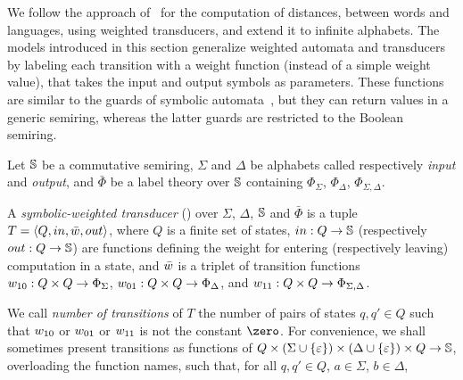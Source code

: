 We follow the approach of~\cite{Mohri03EDWA} for the computation of distances,
between words and languages, using weighted transducers,
and extend it to infinite alphabets.
%
The models introduced in this section generalize
weighted automata and transducers~\cite{Droste09handbook}
by labeling each transition with a weight function (instead of a simple weight value),
that takes the input and output symbols as parameters.
These functions are similar to the guards of symbolic automata~\cite{dAntoniVeanes17CAV,dAntoni21CACM},
but they can return values in a generic semiring,
whereas the latter guards are restricted to the Boolean semiring.
%

\noindent
Let $\mathbb{S}$ be a commutative semiring,
$\Sigma$ and $\Delta$ be alphabets called respectively \emph{input} and \emph{output}, %
and $\bar\Phi$ be a label theory over $\mathbb{S}$
containing $\Phi_\Sigma$, $\Phi_\Delta$, $\Phi_{\Sigma, \Delta}$.

\begin{definition}
\label{def:transducer} \label{def:SWT}
A \emph{symbolic-weighted transducer} (\SWT)
over $\Sigma$, $\Delta$, $\mathbb{S}$ and $\bar\Phi$
is a tuple
$T = \< Q, \init, \bar{\wei}, \final >$,
where $Q$ is a finite set of states,
$\mathsf{in} : Q \to \Semiring$   %
(respectively $\mathsf{out} : Q \to \Semiring$)  %
are functions defining the weight for entering
(respectively leaving) computation in a state,
and $\bar{\wei}$ is a triplet of transition functions
$\wei_{10}: Q \times Q \to \Phi_{\Sigma}$,
$\wei_{01}: Q \times Q \to \Phi_{\Delta}$, and
$\wei_{11}: Q \times Q \to \Phi_{\Sigma, \Delta}$.
\end{definition}
%
\noindent
We call \emph{number of transitions} of $T$ the number of pairs of states
$q, q' \in Q$ such that $\wei_{10}$ or $\wei_{01}$ or $\wei_{11}$
is not the constant $\zero$.
%
\noindent
For convenience, we shall sometimes present transitions
as functions of
$Q \times (\Sigma \cup \{ \varepsilon \}) \times (\Delta \cup \{ \varepsilon \}) \times Q \to \mathbb{S}$,
overloading the function names,
such that, for all $q, q' \in Q$, $a \in \Sigma$,  $b \in \Delta$,

